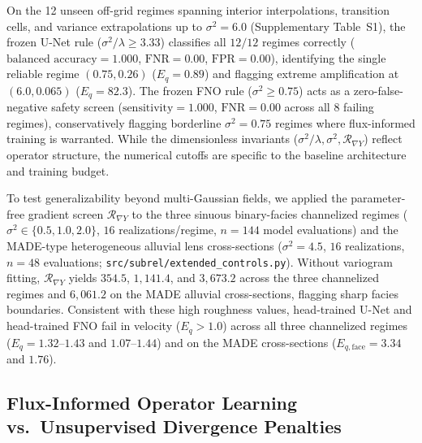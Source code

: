 \documentclass[preprint,12pt,authoryear]{elsarticle}
\begin{document}
On the 12 unseen off-grid regimes spanning interior interpolations, transition cells, and variance extrapolations up to $\sigma^2 = 6.0$ (Supplementary Table~S1), the frozen U-Net rule ($\sigma^2/\lambda \ge 3.33$) classifies all $12/12$ regimes correctly ($\text{balanced accuracy} = 1.000$, $\text{FNR} = 0.00$, $\text{FPR} = 0.00$), identifying the single reliable regime $(0.75, 0.26)$ ($E_q = 0.89$) and flagging extreme amplification at $(6.0, 0.065)$ ($E_q = 82.3$). The frozen FNO rule ($\sigma^2 \ge 0.75$) acts as a zero-false-negative safety screen ($\text{sensitivity} = 1.000$, $\text{FNR} = 0.00$ across all $8$ failing regimes), conservatively flagging borderline $\sigma^2 = 0.75$ regimes where flux-informed training is warranted. While the dimensionless invariants ($\sigma^2/\lambda, \sigma^2, \mathcal{R}_{\nabla Y}$) reflect operator structure, the numerical cutoffs are specific to the baseline architecture and training budget.

To test generalizability beyond multi-Gaussian fields, we applied the parameter-free gradient screen $\mathcal{R}_{\nabla Y}$ to the three sinuous binary-facies channelized regimes ($\sigma^2 \in \{0.5, 1.0, 2.0\}$, $16$ realizations/regime, $n = 144$ model evaluations) and the MADE-type heterogeneous alluvial lens cross-sections ($\sigma^2 = 4.5$, $16$ realizations, $n = 48$ evaluations; \texttt{src/subrel/extended\_controls.py}). Without variogram fitting, $\mathcal{R}_{\nabla Y}$ yields $354.5$, $1{,}141.4$, and $3{,}673.2$ across the three channelized regimes and $6{,}061.2$ on the MADE alluvial cross-sections, flagging sharp facies boundaries. Consistent with these high roughness values, head-trained U-Net and head-trained FNO fail in velocity ($E_q > 1.0$) across all three channelized regimes ($E_q = 1.32$--$1.43$ and $1.07$--$1.44$) and on the MADE cross-sections ($E_{q,\text{face}} = 3.34$ and $1.76$).

\subsection{Flux-Informed Operator Learning vs.\ Unsupervised Divergence Penalties}
\label{sec:repairs_results}
\end{document}
